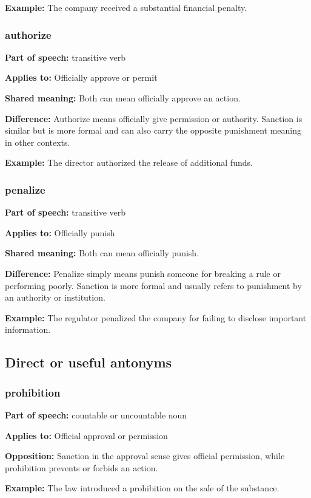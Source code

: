 \documentclass[11pt]{article}
\begin{document}
\textbf{Example:} The company received a substantial financial penalty.

\subsubsection{authorize}
\textbf{Part of speech:} transitive verb

\textbf{Applies to:} Officially approve or permit

\textbf{Shared meaning:} Both can mean officially approve an action.

\textbf{Difference:} Authorize means officially give permission or authority. Sanction is similar but is more formal and can also carry the opposite punishment meaning in other contexts.

\textbf{Example:} The director authorized the release of additional funds.

\subsubsection{penalize}
\textbf{Part of speech:} transitive verb

\textbf{Applies to:} Officially punish

\textbf{Shared meaning:} Both can mean officially punish.

\textbf{Difference:} Penalize simply means punish someone for breaking a rule or performing poorly. Sanction is more formal and usually refers to punishment by an authority or institution.

\textbf{Example:} The regulator penalized the company for failing to disclose important information.

\subsection{Direct or useful antonyms}
\subsubsection{prohibition}
\textbf{Part of speech:} countable or uncountable noun

\textbf{Applies to:} Official approval or permission

\textbf{Opposition:} Sanction in the approval sense gives official permission, while prohibition prevents or forbids an action.

\textbf{Example:} The law introduced a prohibition on the sale of the substance.
\end{document}
